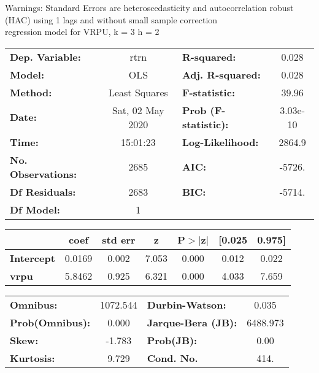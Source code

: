 Warnings: \newline
 [1] Standard Errors are heteroscedasticity and autocorrelation robust (HAC) using 1 lags and without small sample correction\\ 

regression model for VRPU, k = 3 h = 2\begin{center}
\begin{tabular}{lclc}
\toprule
\textbf{Dep. Variable:}    &       rtrn       & \textbf{  R-squared:         } &     0.028   \\
\textbf{Model:}            &       OLS        & \textbf{  Adj. R-squared:    } &     0.028   \\
\textbf{Method:}           &  Least Squares   & \textbf{  F-statistic:       } &     39.96   \\
\textbf{Date:}             & Sat, 02 May 2020 & \textbf{  Prob (F-statistic):} &  3.03e-10   \\
\textbf{Time:}             &     15:01:23     & \textbf{  Log-Likelihood:    } &    2864.9   \\
\textbf{No. Observations:} &        2685      & \textbf{  AIC:               } &    -5726.   \\
\textbf{Df Residuals:}     &        2683      & \textbf{  BIC:               } &    -5714.   \\
\textbf{Df Model:}         &           1      & \textbf{                     } &             \\
\bottomrule
\end{tabular}
\begin{tabular}{lcccccc}
                   & \textbf{coef} & \textbf{std err} & \textbf{z} & \textbf{P$> |$z$|$} & \textbf{[0.025} & \textbf{0.975]}  \\
\midrule
\textbf{Intercept} &       0.0169  &        0.002     &     7.053  &         0.000        &        0.012    &        0.022     \\
\textbf{vrpu}      &       5.8462  &        0.925     &     6.321  &         0.000        &        4.033    &        7.659     \\
\bottomrule
\end{tabular}
\begin{tabular}{lclc}
\textbf{Omnibus:}       & 1072.544 & \textbf{  Durbin-Watson:     } &    0.035  \\
\textbf{Prob(Omnibus):} &   0.000  & \textbf{  Jarque-Bera (JB):  } & 6488.973  \\
\textbf{Skew:}          &  -1.783  & \textbf{  Prob(JB):          } &     0.00  \\
\textbf{Kurtosis:}      &   9.729  & \textbf{  Cond. No.          } &     414.  \\
\bottomrule
\end{tabular}
\end{center}

